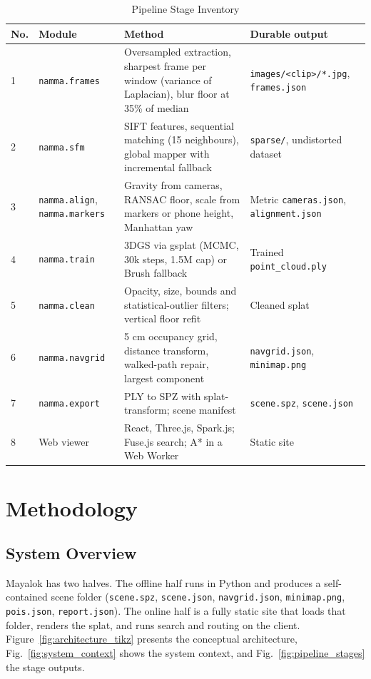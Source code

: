 \documentclass[conference]{IEEEtran}
\begin{document}
\begin{table}[!tb]
\centering
\footnotesize
\caption{Pipeline Stage Inventory}
\label{tab:stages}
\begin{tabular}{p{}p{}p{}p{}}
\toprule
\textbf{No.} & \textbf{Module} & \textbf{Method} & \textbf{Durable output} \\
\midrule
1 & \texttt{namma.frames} & Oversampled extraction, sharpest frame per window (variance of Laplacian), blur floor at 35\% of median & \texttt{images/<clip>/*.jpg}, \texttt{frames.json} \\
2 & \texttt{namma.sfm} & SIFT features, sequential matching (15 neighbours), global mapper with incremental fallback & \texttt{sparse/}, undistorted dataset \\
3 & \texttt{namma.align}, \texttt{namma.markers} & Gravity from cameras, RANSAC floor, scale from markers or phone height, Manhattan yaw & Metric \texttt{cameras.json}, \texttt{alignment.json} \\
4 & \texttt{namma.train} & 3DGS via gsplat (MCMC, 30k steps, 1.5M cap) or Brush fallback & Trained \texttt{point\_cloud.ply} \\
5 & \texttt{namma.clean} & Opacity, size, bounds and statistical-outlier filters; vertical floor refit & Cleaned splat \\
6 & \texttt{namma.navgrid} & 5 cm occupancy grid, distance transform, walked-path repair, largest component & \texttt{navgrid.json}, \texttt{minimap.png} \\
7 & \texttt{namma.export} & PLY to SPZ with splat-transform; scene manifest & \texttt{scene.spz}, \texttt{scene.json} \\
8 & Web viewer & React, Three.js, Spark.js; Fuse.js search; A* in a Web Worker & Static site \\
\bottomrule
\end{tabular}
\end{table}

\section{Methodology}
\subsection{System Overview}
Mayalok has two halves. The offline half runs in Python and produces a self-contained scene folder (\texttt{scene.spz}, \texttt{scene.json}, \texttt{navgrid.json}, \texttt{minimap.png}, \texttt{pois.json}, \texttt{report.json}). The online half is a fully static site that loads that folder, renders the splat, and runs search and routing on the client. Figure~\ref{fig:architecture_tikz} presents the conceptual architecture, Fig.~\ref{fig:system_context} shows the system context, and Fig.~\ref{fig:pipeline_stages} the stage outputs.
\end{document}
